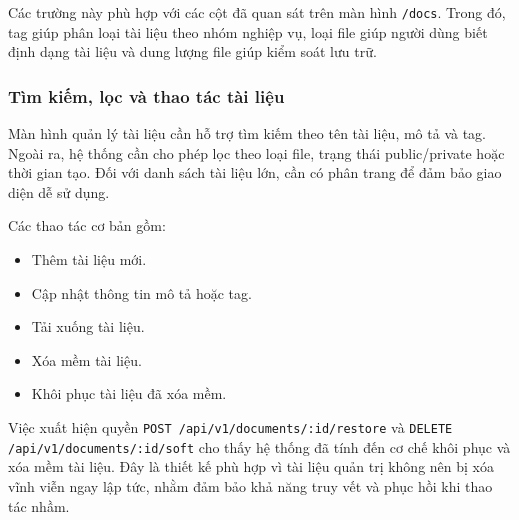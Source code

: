Các trường này phù hợp với các cột đã quan sát trên màn hình \texttt{/docs}. Trong đó, tag giúp phân loại tài liệu theo nhóm nghiệp vụ, loại file giúp người dùng biết định dạng tài liệu và dung lượng file giúp kiểm soát lưu trữ.

\subsubsection{Tìm kiếm, lọc và thao tác tài liệu}

Màn hình quản lý tài liệu cần hỗ trợ tìm kiếm theo tên tài liệu, mô tả và tag. Ngoài ra, hệ thống cần cho phép lọc theo loại file, trạng thái public/private hoặc thời gian tạo. Đối với danh sách tài liệu lớn, cần có phân trang để đảm bảo giao diện dễ sử dụng.

Các thao tác cơ bản gồm:

\begin{itemize}
    \item Thêm tài liệu mới.
    \item Cập nhật thông tin mô tả hoặc tag.
    \item Tải xuống tài liệu.
    \item Xóa mềm tài liệu.
    \item Khôi phục tài liệu đã xóa mềm.
\end{itemize}

Việc xuất hiện quyền \texttt{POST /api/v1/documents/:id/restore} và \texttt{DELETE /api/v1/documents/:id/soft} cho thấy hệ thống đã tính đến cơ chế khôi phục và xóa mềm tài liệu. Đây là thiết kế phù hợp vì tài liệu quản trị không nên bị xóa vĩnh viễn ngay lập tức, nhằm đảm bảo khả năng truy vết và phục hồi khi thao tác nhầm.
